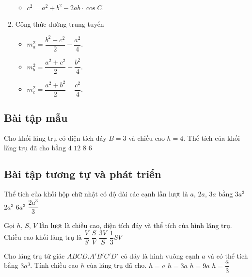 \begin{khung}
\begin{enumerate}
\begin{itemize}
				\item $c^2=a^2+b^2-2ab\cdot \cos C$.
			\end{itemize}
		\item Công thức đường trung tuyến
			\begin{multicols}{3}
			\begin{itemize}
				\item $m_a^2=\dfrac{b^2+c^2}{2}-\dfrac{a^2}{4}$.
				\item $m_b^2=\dfrac{a^2+c^2}{2}-\dfrac{b^2}{4}$.
				\item $m_c^2=\dfrac{a^2+b^2}{2}-\dfrac{c^2}{4}$.
			\end{itemize}
		\end{multicols}	
	\end{enumerate}
\end{khung}
\subsection{Bài tập mẫu}
\begin{khung}
	\begin{vd}%
		Cho khối lăng trụ có diện tích đáy $B=3$ và chiều cao $h=4$. Thể tích của khối lăng trụ đã cho bằng
		\choice
		{ $4$}
		{ \True $12$}
		{ $8$}
		{ $6$}
	\end{vd}
\end{khung}
\subsection{Bài tập tương tự và phát triển}
\begin{ex}%
	Thể tích của khối hộp chữ nhật có độ dài các cạnh lần lượt là $a$, $2a$, $3a$ bằng
	\choice
	{ $3a^3$}
	{ $2a^3$}
	{ \True$6a^3$}
	{ $\dfrac{2a^3}{3}$}
\end{ex}

\begin{ex}%
	Gọi $h$, $S$, $V$ lần lượt là chiều cao, diện tích đáy và thể tích của hình lăng trụ. Chiều cao khối lăng trụ là
	\choice
	{ \True$\dfrac{V}{S}$}
	{ $\dfrac{S}{V}$}
	{ $\dfrac{3V}{S}$}
	{ $\dfrac{1}{3}SV$}
\end{ex}

\begin{ex}%
	Cho lăng trụ tứ giác $ABCD.A'B'C'D'$ có đáy là hình vuông cạnh $a$ và có thể tích bằng $3a^3$. Tính chiều cao $h$ của lăng trụ đã cho.
	\choice
	{ $h=a$}
	{ \True$h=3a$}
	{ $h=9a$}
	{ $h=\dfrac{a}{3}$}
\end{ex}

